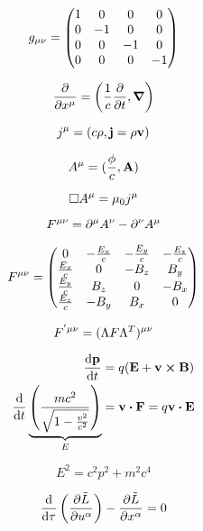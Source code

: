 \documentclass[11pt,twoside]{article}
\begin{document}
\begin{multicols}{3}
\begin{footnotesize}
\begin{equation}
g_{\mu\nu} = \mqty(\dmat[0]{1,-1,-1,-1})
\end{equation}

\begin{equation}
\pdv{x\indices{^\mu}} = \left(\frac{1}{c}\pdv{t}, \gradient \right)
\end{equation}

\begin{equation}
j\indices{^\mu} = (c\rho, \vb{j} = \rho \vb{v})
\end{equation}

\begin{equation}
A\indices{^\mu} = (\frac{\phi}{c}, \vb{A})
\end{equation}

\begin{equation}
\Box A\indices{^\mu} = \mu_0 j\indices{^\mu}
\end{equation}

\begin{equation}
F\indices{^{\mu\nu}} = \partial\indices{^\mu}A\indices{^\nu} - \partial\indices{^\nu}A\indices{^\mu} 
\end{equation}

\begin{equation}
F\indices{^{\mu\nu}} = \mqty(0&-\frac{E_x}{c}&-\frac{E_y}{c}&-\frac{E_z}{c} \\ \frac{E_x}{c}&0&-B_z&B_y \\ \frac{E_y}{c}&B_z&0&-B_x\\\frac{E_z}{c}&-B_y&B_x&0)
\end{equation}

\begin{equation}
F\indices{^{'\mu\nu}} = (\Lambda F \Lambda^T)\indices{^{\mu\nu}}
\end{equation}

\begin{equation}
\begin{split}
\dv{\vb{p}}{t}&=q(\vb{E}+\vb{v}\cross\vb{B})\\
\dv{t}\underbrace{\left(\frac{mc^2}{\sqrt{1-\frac{v^2}{c^2}}} \right)}_{E} &= \vb{v}\vdot\vb{F} = q\vb{v}\vdot\vb{E}
\end{split}
\end{equation}

\begin{equation}
E^2 = c^2p^2+m^2c^4
\end{equation}

\begin{equation}
\dv{\tau}\left(\pdv{\tilde{L}}{u\indices{^\alpha}} \right) - \pdv{\tilde{L}}{x\indices{^\alpha}} = 0
\end{equation}


\end{footnotesize}
\end{multicols}
\end{document}
